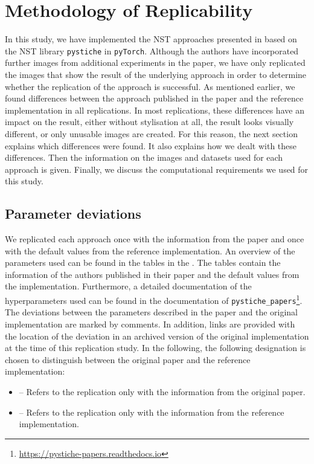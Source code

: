 \section{Methodology of Replicability}
In this study, we have implemented the \gls{NST} approaches presented in  based on the \gls{NST} library \texttt{pystiche} \cite{ML2020} in \texttt{pyTorch}. Although the authors have incorporated further images from additional experiments in the paper, we have only replicated the images that show the result of the underlying approach in order to determine whether the replication of the approach is successful. As mentioned earlier, we found differences between the approach published in the paper and the reference implementation in all replications. In most replications, these differences have an impact on the result, either without stylisation at all, the result looks visually different, or only unusable images are created. For this reason, the next section explains which differences were found. It also explains how we dealt with these differences. Then the information on the images and datasets used for each approach is given. Finally, we discuss the computational requirements we used for this study. 

\subsection{Parameter deviations} \label{sec:replicability}
We replicated each approach once with the information from the paper and once with the default values from the reference implementation. An overview of the parameters used can be found in the tables in the . The tables contain the information of the authors published in their paper and the default values from the implementation. Furthermore, a detailed documentation of the hyperparameters used can be found in the documentation of \texttt{pystiche\_papers}\footnote{\url{https://pystiche-papers.readthedocs.io}}. The deviations between the parameters described in the paper and the original implementation are marked by comments. In addition, links are provided with the location of the deviation in an archived version of the original implementation at the time of this replication study. In the following, the following designation is chosen to distinguish between the original paper and the reference implementation: 
\begin{itemize}
	\item \paper{} -- Refers to the replication only with the information from the original paper. 
	\item \implementation{} -- Refers to the replication only with the information from the reference implementation. 
\end{itemize}

